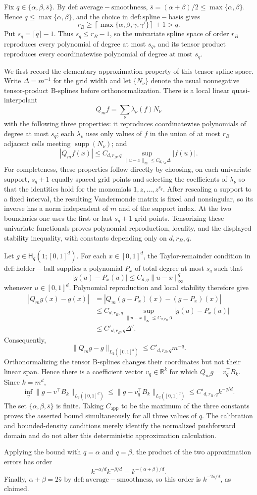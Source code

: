Fix \(q\in\{\alpha,\beta,\bar s\}\). By \(\mathrm{def:average-smoothness}\), \(\bar s=(\alpha+\beta)/2\le \max\{\alpha,\beta\}\). Hence \(q\le \max\{\alpha,\beta\}\), and the choice in \(\mathrm{def:spline-basis}\) gives
\[
r_B\ge \left\lceil\max\{\alpha,\beta,\gamma,\gamma'\}\right\rceil+1>q.
\]
Put \(s_q=\lceil q\rceil-1\). Thus \(s_q\le r_B-1\), so the univariate spline space of order \(r_B\) reproduces every polynomial of degree at most \(s_q\), and its tensor product reproduces every coordinatewise polynomial of degree at most \(s_q\).

We first record the elementary approximation property of this tensor spline space. Write \(\Delta=m^{-1}\) for the grid width and let \(\{N_\nu\}\) denote the usual nonnegative tensor-product B-splines before orthonormalization. There is a local linear quasi-interpolant
\[
Q_m f=\sum_\nu \lambda_\nu(f)N_\nu
\]
with the following three properties: it reproduces coordinatewise polynomials of degree at most \(s_q\); each \(\lambda_\nu\) uses only values of \(f\) in the union of at most \(r_B\) adjacent cells meeting \(\operatorname{supp}(N_\nu)\); and
\[
|Q_m f(x)|\le C_{d,r_B,q}\sup_{\|u-x\|_\infty\le C_{d,r_B}\Delta}|f(u)|.
\]
For completeness, these properties follow directly by choosing, on each univariate support, \(s_q+1\) equally spaced grid points and selecting the coefficients of \(\lambda_\nu\) so that the identities hold for the monomials \(1,z,\ldots,z^{s_q}\). After rescaling a support to a fixed interval, the resulting Vandermonde matrix is fixed and nonsingular, so its inverse has a norm independent of \(m\) and of the support index. At the two boundaries one uses the first or last \(s_q+1\) grid points. Tensorizing these univariate functionals proves polynomial reproduction, locality, and the displayed stability inequality, with constants depending only on \(d,r_B,q\).

Let \(g\in\mathsf H_q(1;[0,1]^d)\). For each \(x\in[0,1]^d\), the Taylor-remainder condition in \(\mathrm{def:holder-ball}\) supplies a polynomial \(P_x\) of total degree at most \(s_q\) such that
\[
|g(u)-P_x(u)|\le C_{d,q}\|u-x\|_\infty^q
\]
whenever \(u\in[0,1]^d\). Polynomial reproduction and local stability therefore give
\[
\begin{aligned}
|Q_mg(x)-g(x)|
&=|Q_m(g-P_x)(x)-(g-P_x)(x)|\\
&\le C_{d,r_B,q}\sup_{\|u-x\|_\infty\le C_{d,r_B}\Delta}|g(u)-P_x(u)|\\
&\le C'_{d,r_B,q}\Delta^q.
\end{aligned}
\]
Consequently,
\[
\|Q_mg-g\|_{L_2([0,1]^d)}\le C'_{d,r_B,q}m^{-q}.
\]
Orthonormalizing the tensor B-splines changes their coordinates but not their linear span. Hence there is a coefficient vector \(v_q\in\mathbb R^k\) for which \(Q_mg=v_q^\top B_k\). Since \(k=m^d\),
\[
\inf_v\|g-v^\top B_k\|_{L_2([0,1]^d)}
\le \|g-v_q^\top B_k\|_{L_2([0,1]^d)}
\le C'_{d,r_B,q}k^{-q/d}.
\]
The set \(\{\alpha,\beta,\bar s\}\) is finite. Taking \(C_{\mathrm{app}}\) to be the maximum of the three constants proves the asserted bound simultaneously for all three values of \(q\). The calibration and bounded-density conditions merely identify the normalized pushforward domain and do not alter this deterministic approximation calculation.

Applying the bound with \(q=\alpha\) and \(q=\beta\), the product of the two approximation errors has order
\[
k^{-\alpha/d}k^{-\beta/d}=k^{-(\alpha+\beta)/d}.
\]
Finally, \(\alpha+\beta=2\bar s\) by \(\mathrm{def:average-smoothness}\), so this order is \(k^{-2\bar s/d}\), as claimed.